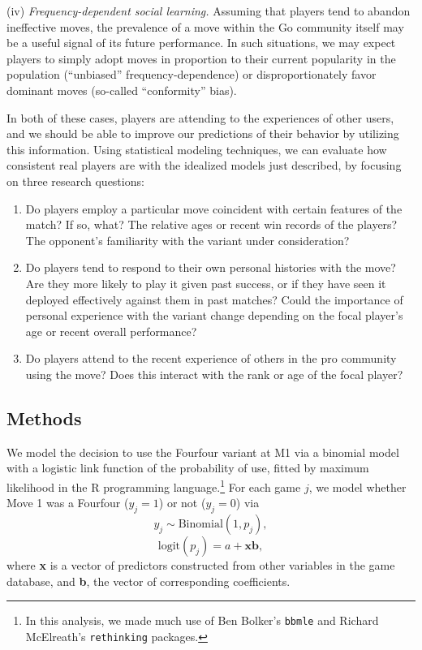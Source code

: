 (iv) \textit{Frequency-dependent social learning.}  Assuming that players tend to abandon ineffective moves, the prevalence of a move within the Go community itself may be a useful signal of its future performance.  In such situations, we may expect players to simply adopt moves in proportion to their current popularity in the population (``unbiased'' frequency-dependence) or disproportionately favor dominant moves (so-called ``conformity'' bias).  

In both of these cases, players are attending to the experiences of other users, and we should be able to improve our predictions of their behavior by utilizing this information.  Using statistical modeling techniques, we can evaluate how consistent real players are with the idealized models just described, by focusing on three research questions:

\begin{enumerate}
\item Do players employ a particular move coincident with certain features of the match?  If so, what?  The relative ages or recent win records of the players?  The opponent's familiarity with the variant under consideration?
\item Do players tend to respond to their own personal histories with the move?  Are they more likely to play it given past success, or if they have seen it deployed effectively against them in past matches? Could the importance of personal experience with the variant change depending on the focal player's age or recent overall performance?
\item Do players attend to the recent experience of others in the pro community using the move?  Does this interact with the rank or age of the focal player?
\end{enumerate}


\subsection{Methods}

We model the decision to use the Fourfour variant at M1 via a binomial model with a logistic link function of the probability of use, fitted by maximum likelihood in the R programming language.\footnote{In this analysis, we made much use of Ben Bolker's \texttt{bbmle} and Richard McElreath's \texttt{rethinking} packages.}  For each game $j$, we model whether Move 1 was a Fourfour ($y_j=1$) or not ($y_j=0$) via 
\newpage
	\[ y_j \sim \mathrm{Binomial}(1, p_j),
\]
	\[ \mathrm{logit}(p_j) = a + \textbf{xb},
\]
where \textbf{x} is a vector of predictors constructed from other variables in the game database, and \textbf{b}, the vector of corresponding coefficients.

